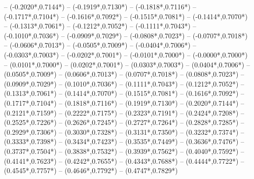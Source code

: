 {	-- ({-0.2020*\dx},{0.7144*\dy})
	-- ({-0.1919*\dx},{0.7130*\dy})
	-- ({-0.1818*\dx},{0.7116*\dy})
	-- ({-0.1717*\dx},{0.7104*\dy})
	-- ({-0.1616*\dx},{0.7092*\dy})
	-- ({-0.1515*\dx},{0.7081*\dy})
	-- ({-0.1414*\dx},{0.7070*\dy})
	-- ({-0.1313*\dx},{0.7061*\dy})
	-- ({-0.1212*\dx},{0.7052*\dy})
	-- ({-0.1111*\dx},{0.7043*\dy})
	-- ({-0.1010*\dx},{0.7036*\dy})
	-- ({-0.0909*\dx},{0.7029*\dy})
	-- ({-0.0808*\dx},{0.7023*\dy})
	-- ({-0.0707*\dx},{0.7018*\dy})
	-- ({-0.0606*\dx},{0.7013*\dy})
	-- ({-0.0505*\dx},{0.7009*\dy})
	-- ({-0.0404*\dx},{0.7006*\dy})
	-- ({-0.0303*\dx},{0.7003*\dy})
	-- ({-0.0202*\dx},{0.7001*\dy})
	-- ({-0.0101*\dx},{0.7000*\dy})
	-- ({-0.0000*\dx},{0.7000*\dy})
	-- ({0.0101*\dx},{0.7000*\dy}) %
	-- ({0.0202*\dx},{0.7001*\dy}) %
	-- ({0.0303*\dx},{0.7003*\dy}) %
	-- ({0.0404*\dx},{0.7006*\dy}) %
	-- ({0.0505*\dx},{0.7009*\dy}) %
	-- ({0.0606*\dx},{0.7013*\dy}) %
	-- ({0.0707*\dx},{0.7018*\dy}) %
	-- ({0.0808*\dx},{0.7023*\dy}) %
	-- ({0.0909*\dx},{0.7029*\dy}) %
	-- ({0.1010*\dx},{0.7036*\dy}) %
	-- ({0.1111*\dx},{0.7043*\dy}) %
	-- ({0.1212*\dx},{0.7052*\dy}) %
	-- ({0.1313*\dx},{0.7061*\dy}) %
	-- ({0.1414*\dx},{0.7070*\dy}) %
	-- ({0.1515*\dx},{0.7081*\dy}) %
	-- ({0.1616*\dx},{0.7092*\dy}) %
	-- ({0.1717*\dx},{0.7104*\dy}) %
	-- ({0.1818*\dx},{0.7116*\dy}) %
	-- ({0.1919*\dx},{0.7130*\dy}) %
	-- ({0.2020*\dx},{0.7144*\dy}) %
	-- ({0.2121*\dx},{0.7159*\dy}) %
	-- ({0.2222*\dx},{0.7175*\dy}) %
	-- ({0.2323*\dx},{0.7191*\dy}) %
	-- ({0.2424*\dx},{0.7208*\dy}) %
	-- ({0.2525*\dx},{0.7226*\dy}) %
	-- ({0.2626*\dx},{0.7245*\dy}) %
	-- ({0.2727*\dx},{0.7264*\dy}) %
	-- ({0.2828*\dx},{0.7285*\dy}) %
	-- ({0.2929*\dx},{0.7306*\dy}) %
	-- ({0.3030*\dx},{0.7328*\dy}) %
	-- ({0.3131*\dx},{0.7350*\dy}) %
	-- ({0.3232*\dx},{0.7374*\dy}) %
	-- ({0.3333*\dx},{0.7398*\dy}) %
	-- ({0.3434*\dx},{0.7423*\dy}) %
	-- ({0.3535*\dx},{0.7449*\dy}) %
	-- ({0.3636*\dx},{0.7476*\dy}) %
	-- ({0.3737*\dx},{0.7504*\dy}) %
	-- ({0.3838*\dx},{0.7532*\dy}) %
	-- ({0.3939*\dx},{0.7562*\dy}) %
	-- ({0.4040*\dx},{0.7592*\dy}) %
	-- ({0.4141*\dx},{0.7623*\dy}) %
	-- ({0.4242*\dx},{0.7655*\dy}) %
	-- ({0.4343*\dx},{0.7688*\dy}) %
	-- ({0.4444*\dx},{0.7722*\dy}) %
	-- ({0.4545*\dx},{0.7757*\dy}) %
	-- ({0.4646*\dx},{0.7792*\dy}) %
	-- ({0.4747*\dx},{0.7829*\dy}) %
}
